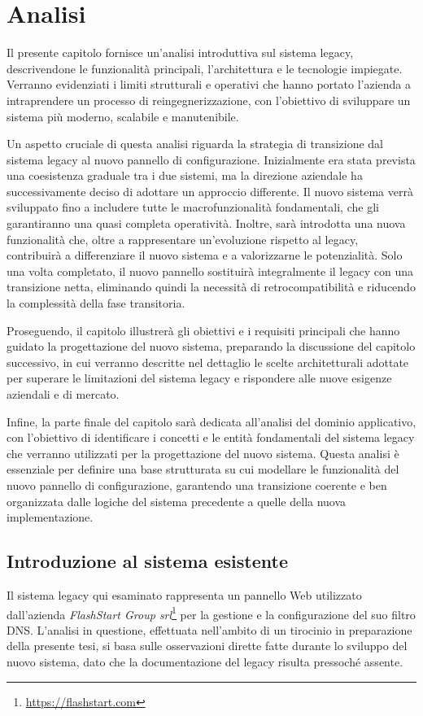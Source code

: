 \chapter{Analisi}
Il presente capitolo fornisce un'analisi introduttiva sul sistema legacy, descrivendone le funzionalità principali, l'architettura e le tecnologie impiegate. Verranno evidenziati i limiti strutturali e operativi che hanno portato l'azienda a intraprendere un processo di reingegnerizzazione, con l'obiettivo di sviluppare un sistema più moderno, scalabile e manutenibile.

Un aspetto cruciale di questa analisi riguarda la strategia di transizione dal sistema legacy al nuovo pannello di configurazione. Inizialmente era stata prevista una coesistenza graduale tra i due sistemi, ma la direzione aziendale ha successivamente deciso di adottare un approccio differente. Il nuovo sistema verrà sviluppato fino a includere tutte le macrofunzionalità fondamentali, che gli garantiranno una quasi completa operatività. Inoltre, sarà introdotta una nuova funzionalità che, oltre a rappresentare un'evoluzione rispetto al legacy, contribuirà a differenziare il nuovo sistema e a valorizzarne le potenzialità.
%
Solo una volta completato, il nuovo pannello sostituirà integralmente il legacy con una transizione netta, eliminando quindi la necessità di retrocompatibilità e riducendo la complessità della fase transitoria.

Proseguendo, il capitolo illustrerà gli obiettivi e i requisiti principali che hanno guidato la progettazione del nuovo sistema, preparando la discussione del capitolo successivo, in cui verranno descritte nel dettaglio le scelte architetturali adottate per superare le limitazioni del sistema legacy e rispondere alle nuove esigenze aziendali e di mercato.

Infine, la parte finale del capitolo sarà dedicata all'analisi del dominio applicativo, con l'obiettivo di identificare i concetti e le entità fondamentali del sistema legacy che verranno utilizzati per la progettazione del nuovo sistema. Questa analisi è essenziale per definire una base strutturata su cui modellare le funzionalità del nuovo pannello di configurazione, garantendo una transizione coerente e ben organizzata dalle logiche del sistema precedente a quelle della nuova implementazione.

\section{Introduzione al sistema esistente}
Il sistema legacy qui esaminato rappresenta un pannello Web utilizzato dall'azienda \textit{FlashStart Group srl}\footnote{\url{https://flashstart.com}} per la gestione e la configurazione del suo filtro DNS. L’analisi in questione, effettuata nell’ambito di un tirocinio in preparazione della presente tesi, si basa sulle osservazioni dirette fatte durante lo sviluppo del nuovo sistema, dato che la documentazione del legacy risulta pressoché assente.

